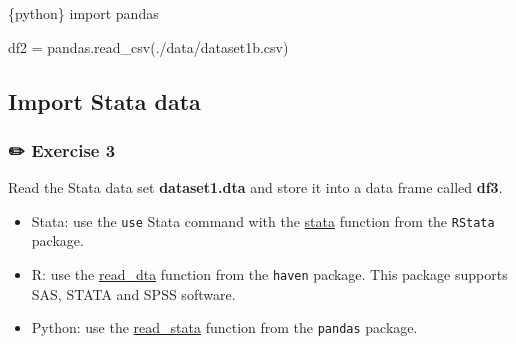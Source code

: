 \documentclass[
  letterpaper,
  DIV=11,
  numbers=noendperiod,
  oneside]{scrreprt}
\newenvironment{Shaded}{\begin{snugshade}}{\end{snugshade}}
\newcommand{\ImportTok}[1]{\textcolor[rgb]{0.00,0.46,0.62}{#1}}
\newcommand{\InformationTok}[1]{\textcolor[rgb]{0.37,0.37,0.37}{#1}}
\newcommand{\NormalTok}[1]{\textcolor[rgb]{0.00,0.23,0.31}{#1}}
\newcommand{\OperatorTok}[1]{\textcolor[rgb]{0.37,0.37,0.37}{#1}}
\newcommand{\StringTok}[1]{\textcolor[rgb]{0.13,0.47,0.30}{#1}}
\providecommand{\tightlist}{%
  \setlength{\itemsep}{0pt}\setlength{\parskip}{0pt}}\usepackage{longtable,booktabs,array}
\begin{document}
\begin{Shaded}
\begin{Highlighting}[]
\InformationTok{\textasciigrave{}\textasciigrave{}\textasciigrave{}\{python\}}
\ImportTok{import}\NormalTok{ pandas}

\NormalTok{df2 }\OperatorTok{=}\NormalTok{ pandas.read\_csv(}\StringTok{\textquotesingle{}./data/dataset1b.csv\textquotesingle{}}\NormalTok{)}
\InformationTok{\textasciigrave{}\textasciigrave{}\textasciigrave{}}
\end{Highlighting}
\end{Shaded}

\hypertarget{import-stata-data}{%
\subsection{Import Stata data}\label{import-stata-data}}

\hypertarget{exercise-3}{%
\subsubsection{\texorpdfstring{{✏️} Exercise
3}{✏️ Exercise 3}}\label{exercise-3}}

Read the Stata data set \textbf{dataset1.dta} and store it into a data
frame called \textbf{df3}.

\begin{tcolorbox}[enhanced jigsaw, colbacktitle=quarto-callout-tip-color!10!white, titlerule=0mm, breakable, opacityback=0, opacitybacktitle=0.6, left=2mm, coltitle=black, colback=white, title=\textcolor{quarto-callout-tip-color}{\faLightbulb}\hspace{0.5em}{Tip}, rightrule=.15mm, colframe=quarto-callout-tip-color-frame, toprule=.15mm, bottomtitle=1mm, toptitle=1mm, arc=.35mm, bottomrule=.15mm, leftrule=.75mm]

\begin{itemize}
\tightlist
\item
  Stata: use the \texttt{use} Stata command with the
  \href{https://rdrr.io/github/lbraglia/RStata/man/stata.html}{stata}
  function from the \texttt{RStata} package.
\item
  R: use the
  \href{https://haven.tidyverse.org/reference/read_dta.html}{read\_dta}
  function from the \texttt{haven} package. This package supports SAS,
  STATA and SPSS software.
\item
  Python: use the
  \href{https://pandas.pydata.org/docs/reference/api/pandas.read_stata.html}{read\_stata}
  function from the \texttt{pandas} package.
\end{itemize}

\end{tcolorbox}
\end{document}

